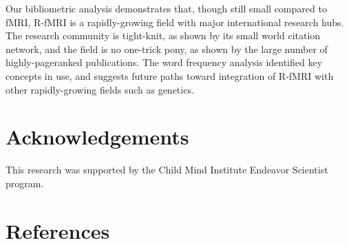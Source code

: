 \documentclass[12pt,5p]{elsarticle}
\begin{document}
Our bibliometric analysis demonstrates that, though still small compared
to fMRI, R-fMRI is a rapidly-growing field with major international
research hubs.  The research community is tight-knit, as shown by its
small world citation network, and the field is no one-trick pony, as shown
by the large number of highly-pageranked publications. The word frequency
analysis identified key concepts in use, and suggests future paths toward
integration of R-fMRI with other rapidly-growing fields such as genetics.

\section{Acknowledgements} This research was supported by the Child Mind
Institute Endeavor Scientist program.

{
\section*{References}

 
}
\end{document}
